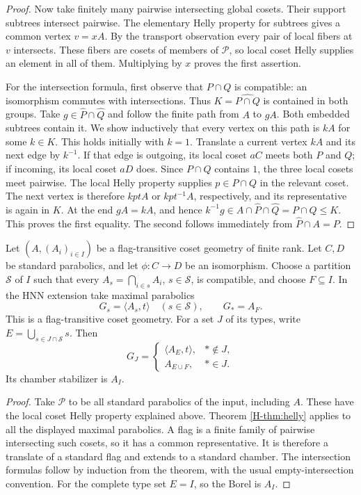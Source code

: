 \begin{proof}
Now take finitely many pairwise intersecting global cosets. Their support
subtrees intersect pairwise. The elementary Helly property for subtrees
gives a common vertex $v=xA$. By the transport observation every pair
of local fibers at $v$ intersects. These fibers are cosets of members
of $\mathcal P$, so local coset Helly supplies an element in all of
them. Multiplying by $x$ proves the first assertion.

For the intersection formula, first observe that $P\cap Q$ is compatible:
an isomorphism commutes with intersections. Thus
$K=\widehat{P\cap Q}$ is contained in both groups. Take
$g\in\widehat P\cap\widehat Q$ and follow the finite path from $A$
to $gA$. Both embedded subtrees contain it. We show inductively that
every vertex on this path is $kA$ for some $k\in K$.
This holds initially with $k=1$. Translate a current vertex $kA$ and
its next edge by $k^{-1}$. If that edge is outgoing, its local coset
$aC$ meets both $P$ and $Q$; if incoming, its local coset $aD$ does.
Since $P\cap Q$ contains $1$, the three local cosets meet pairwise.
The local Helly property supplies $p\in P\cap Q$ in the relevant
coset. The next vertex is therefore $kp tA$ or $kp t^{-1}A$,
respectively, and its representative is again in $K$.
At the end $gA=kA$, and hence
$k^{-1}g\in A\cap\widehat P\cap\widehat Q=P\cap Q\leq K$.
This proves the first equality. The second follows immediately from
$\widehat P\cap A=P$.
\end{proof}

\begin{corollary}\label{H-cor:geometry}
Let $(A,(A_i)_{i\in I})$ be a flag-transitive coset geometry of finite
rank. Let $C,D$ be standard parabolics, and let $\phi:C\to D$ be an
isomorphism. Choose a partition $\mathcal S$ of $I$ such that every
$A_s=\bigcap_{i\in s}A_i$, $s\in\mathcal S$, is compatible, and choose
$F\subseteq I$. In the HNN extension take maximal parabolics
\[
 G_s=\langle A_s,t\rangle\quad(s\in\mathcal S),\qquad
 G_*=A_F.
\]
This is a flag-transitive coset geometry. For a set $J$ of its types,
write $E=\bigcup_{s\in J\cap\mathcal S}s$. Then
\[
 G_J=
 \begin{cases}
   \langle A_E,t\rangle,&*\notin J,\\
   A_{E\cup F},&*\in J.
 \end{cases}
\]
Its chamber stabilizer is $A_I$.
\end{corollary}
\begin{proof}
Take $\mathcal P$ to be all standard parabolics of the input, including
$A$. These have the local coset Helly property explained above. Theorem
\ref{H-thm:helly} applies to all the displayed maximal parabolics. A flag
is a finite family of pairwise intersecting such cosets, so it has a
common representative. It is therefore a translate of a standard flag
and extends to a standard chamber. The intersection formulas follow
by induction from the theorem, with the usual empty-intersection convention.
For the complete type set $E=I$, so the Borel is $A_I$.
\end{proof}


